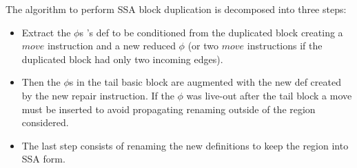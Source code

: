 The algorithm to perform SSA block duplication is decomposed into three steps: 
\begin{itemize}
\item Extract the $\phi$s 's def to be conditioned from the duplicated block creating a $move$ instruction and a new reduced $\phi$ (or two $move$ instructions if the duplicated block had only two incoming edges).
\item Then the $\phi$s in the tail basic block are augmented with the new def created by the new repair instruction. If the $\phi$ was live-out after the tail block a move must be inserted to avoid propagating renaming outside of the region considered. 
\item The last step consists of renaming the new definitions to keep the region into SSA form.
\end{itemize}

